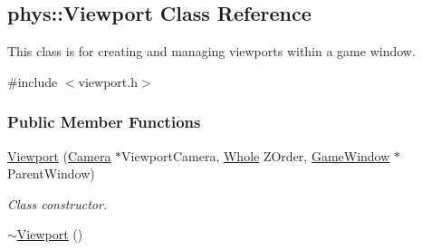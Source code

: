 \hypertarget{classphys_1_1Viewport}{
\subsection{phys::Viewport Class Reference}
\label{classphys_1_1Viewport}
}


This class is for creating and managing viewports within a game window.  




{\ttfamily \#include $<$viewport.h$>$}

\subsubsection*{Public Member Functions}
\begin{DoxyCompactItemize}
\item 
\hyperlink{classphys_1_1Viewport_a83634ee2144fadd80fec3028885b92f2}{Viewport} (\hyperlink{classphys_1_1Camera}{Camera} $\ast$ViewportCamera, \hyperlink{namespacephys_a460f6bc24c8dd347b05e0366ae34f34a}{Whole} ZOrder, \hyperlink{classphys_1_1GameWindow}{GameWindow} $\ast$ParentWindow)
\begin{DoxyCompactList}\small\item\em Class constructor. \item\end{DoxyCompactList}\item 
\hypertarget{classphys_1_1Viewport_a2ac669dde60b69641d309e81c3108db4}{
\hyperlink{classphys_1_1Viewport_a2ac669dde60b69641d309e81c3108db4}{$\sim$Viewport} ()}
\label{classphys_1_1Viewport_a2ac669dde60b69641d309e81c3108db4}


\end{DoxyCompactItemize}
